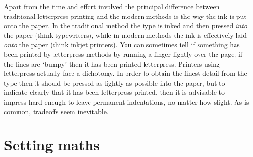 \documentclass[10pt,a4paper,extrafontsizes]{memoir}
\begin{document}
\begin{paracol}{2}
   Apart from the time and effort involved the principal difference between
traditional letterpress printing and the modern methods 
is the way the ink is put onto the paper. In the traditional method the type
is inked and then pressed \emph{into} the paper (think typewriters), while 
in modern methods the ink is effectively laid \emph{onto} the paper (think
inkjet printers). You can sometimes tell if something has 
been printed by letterpress methods by running a finger lightly over the page;
if the lines are `bumpy' then it has been printed letterpress. Printers using
letterpress actually face a dichotomy. In order to obtain the finest detail
from the type then it should be pressed as lightly as possible into the paper,
but to indicate clearly that it has been letterpress printed, then it is 
advisable to impress hard enough to leave permanent indentations, no matter
how slight. As is common, tradeoffs seem inevitable.
\end{paracol}


\section{Setting maths}
\end{document}
